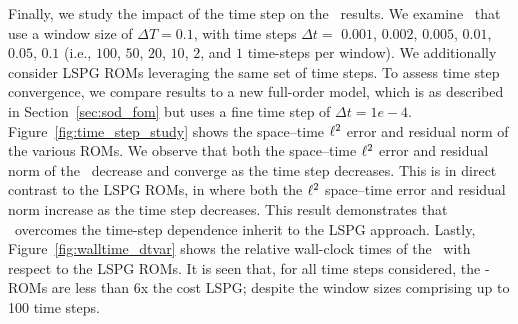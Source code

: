 Finally, we study the impact of the time step on the \methodAcronymROM\ results. We examine \methodAcronymROMs\ that use a
window size of $\Delta T = 0.1$, with time steps $\Delta t =$  $0.001$, $0.002$, $0.005$, $0.01$, $0.05$, $0.1$ (i.e.,  
$100$, $50$, $20$, $10$, $2$, and $1$ time-steps per window). We additionally 
consider LSPG ROMs leveraging the same set of time steps. To assess time step convergence, we compare results to a new full-order model, which is as described in Section~\ref{sec:sod_fom} but uses a fine time step of $\Delta t = 1e-4$. Figure~\ref{fig:time_step_study} shows the space--time $\ell^2$ error and residual norm  
of the various ROMs. We observe that both the space--time $\ell^2$ error and residual norm 
of the \methodAcronymROMs\ decrease and converge as the time step decreases. This is in direct contrast to the LSPG ROMs, in where both the $\ell^2$ 
space--time error and residual norm increase as the time step decreases. This result 
demonstrates that \methodAcronym\ overcomes the time-step dependence inherit to the LSPG approach. Lastly, Figure~\ref{fig:walltime_dtvar}
shows the relative wall-clock times of the \methodAcronymROMs\ with respect to the LSPG ROMs. It is seen that, for all time steps considered, the \methodAcronym-ROMs 
are less than 6x the cost LSPG; despite the window sizes comprising up to 100 time steps. 
